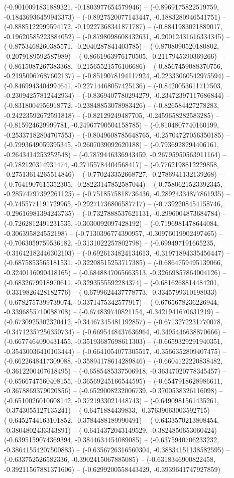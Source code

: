 (-0.9010091831889321, -0.1803977654579946) -- (-0.8969175822519759, -0.18436936459943373) -- (-0.8927520077143447, -0.1883280946541751) -- (-0.8885122999594172, -0.19227368341871787) -- (-0.8841983021889017, -0.19620585223884052) -- (-0.8798098608432631, -0.20012431616334345) -- (-0.8753468260385571, -0.2040287841403785) -- (-0.8708090520180802, -0.2079189592587989) -- (-0.8661963976170505, -0.2117945390369266) -- (-0.8615087267383368, -0.21565521576106686) -- (-0.8567459088370756, -0.21950067687602137) -- (-0.8519078194117924, -0.22333060542975594) -- (-0.8469943404994641, -0.22714468057425136) -- (-0.8420053611717503, -0.23094257812442934) -- (-0.8369407780294279, -0.23472397117686844) -- (-0.8318004956918772, -0.23848853078983426) -- (-0.826584427278283, -0.24223592672591818) -- (-0.82129249487705, -0.2459658282583285) -- (-0.815924629999781, -0.24967790504158785) -- (-0.8104807740160199, -0.25337182804707553) -- (-0.8049608785648765, -0.25704727056350185) -- (-0.7993649059395345, -0.2607039092620188) -- (-0.7936928294406161, -0.2643414253252548) -- (-0.7879446336943459, -0.26795950563911164) -- (-0.782120314931474, -0.27155784404568417) -- (-0.7762198812229858, -0.27513614265514846) -- (-0.770243352668727, -0.2786941132139268) -- (-0.7641907615352305, -0.28223147852587044) -- (-0.7580621523392345, -0.28574797392261125) -- (-0.7518575818736436, -0.28924334877861935) -- (-0.7455771191729965, -0.29271736806587717) -- (-0.7392208454158746, -0.29616981394243735) -- (-0.7327888537621131, -0.2996004873684784) -- (-0.7262812491231535, -0.3030092097428192) -- (-0.7196981478644084, -0.306395824552198) -- (-0.7130396774390957, -0.30976019902497465) -- (-0.7063059759536182, -0.3131022257802798) -- (-0.699497191665235, -0.31642182446302103) -- (-0.6926134824134613, -0.31971894335456447) -- (-0.6875853565181531, -0.32208515253717385) -- (-0.6864759495139066, -0.3240116090418165) -- (-0.6848847065663513, -0.32669857864004126) -- (-0.6832679918970611, -0.3293555592284374) -- (-0.6816268814484201, -0.3319826428182776) -- (-0.6799624437778773, -0.3345799310198033) -- (-0.6782757399739074, -0.3371475342577917) -- (-0.6765678236226944, -0.3396855710088708) -- (-0.674839740821154, -0.3421941670631219) -- (-0.6730925302320412, -0.34467345481192857) -- (-0.6713272231770078, -0.34712357256350734) -- (-0.6695448437636964, -0.3495446638870666) -- (-0.6677464090431455, -0.35193687698611303) -- (-0.6659329291940351, -0.35430036410103444) -- (-0.6641054077305517, -0.3566352809407475) -- (-0.6622648417309088, -0.35894178614289846) -- (-0.6604122220838482, -0.3612200407618495) -- (-0.6585485337506918, -0.36347020778345457) -- (-0.6566747560408155, -0.36569245166544595) -- (-0.6547918628986611, -0.3678869379020856) -- (-0.6529008232006739, -0.3700538326116098) -- (-0.6510026010608142, -0.3721933021448743) -- (-0.6490981561435261, -0.3743055127135241) -- (-0.6471884439833, -0.37639063003592715) -- (-0.6452744163101852, -0.3784488189990491) -- (-0.6433570213808454, -0.3804802433343891) -- (-0.6414372043149529, -0.3824850653060424) -- (-0.6395159074369394, -0.3844634454089085) -- (-0.6375940706233232, -0.38641554207500883) -- (-0.6356726316560304, -0.38834151138582595) -- (-0.633752526582336, -0.3902415067885085) -- (-0.6318346900822458, -0.39211567881371606) -- (-0.6299200558443429, -0.3939641747927859) 